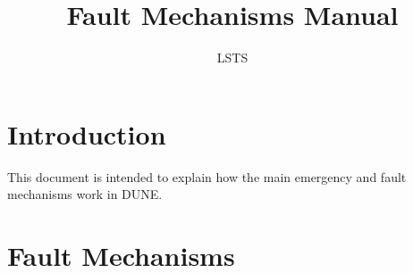 \documentclass[a4paper]{scrreprt}
\begin{document}
\title{Fault Mechanisms Manual}

\author{LSTS}%

\maketitle

\setcounter{tocdepth}{1}
\tableofcontents

\chapter{Introduction}
This document is intended to explain how the main emergency and fault mechanisms work in DUNE.

\chapter{Fault Mechanisms}

\footnotesize

\newcommand{\firstcolsize}{4cm}
\newcommand{\lastcolsize}{10cm}
\newcommand{\beginconfigtable}{\begin{tabular}{|p{\firstcolsize} | l | l | p{\lastcolsize}|}}
  \newcommand{\tableheader}{\rowcolor[gray]{0.8}{\bf{Parameter Name}} & \bf{Acronym} & \bf{Default} & \bf{Description} \\}
  \newcommand{\secnameConfig}{Configuration}
  \newcommand{\secnameDescription}{Description}
  \newcommand{\secnameFlowchart}{Flowchart}








% 
% 
\end{document}

